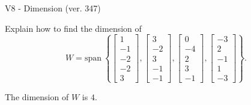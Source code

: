 \begin{exercise}
  \begin{exerciseTitle}V8 - Dimension (ver. 347)\end{exerciseTitle}
  \begin{exerciseStatement}
    Explain how to find the dimension of 
\[W=\mathrm{span}\ \left\{\left[\begin{array}{r}
1 \\
-1 \\
-2 \\
-2 \\
3
\end{array}\right] , \left[\begin{array}{r}
3 \\
-2 \\
3 \\
-1 \\
-1
\end{array}\right] , \left[\begin{array}{r}
0 \\
-4 \\
2 \\
3 \\
-1
\end{array}\right] , \left[\begin{array}{r}
-3 \\
2 \\
-1 \\
1 \\
-3
\end{array}\right]\right\}.\]



  \end{exerciseStatement}
  \begin{exerciseAnswer}
   The dimension of \(W\) is  \(4\).
  


  \end{exerciseAnswer}
\end{exercise}